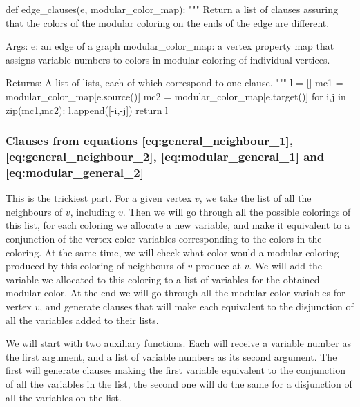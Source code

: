 \documentclass[letterpaper]{article}
\begin{document}
\begin{pyblock}
def edge_clauses(e, modular_color_map):
   """
   Return a list of clauses assuring that the colors of the 
   modular coloring on the ends of the edge are different.

   Args:
      e: an edge of a graph
      modular_color_map: a vertex property map that assigns 
      variable numbers to colors in modular coloring of 
      individual vertices.

   Returns:
      A list of lists, each of which correspond to one clause.
   """
   l = []
   mc1 = modular_color_map[e.source()]
   mc2 = modular_color_map[e.target()]
   for i,j in zip(mc1,mc2):
      l.append([-i,-j])
   return l
\end{pyblock}

\subsubsection{Clauses from equations \eqref{eq:general_neighbour_1},
\eqref{eq:general_neighbour_2}, \eqref{eq:modular_general_1} and
\eqref{eq:modular_general_2}}

This is the trickiest part.  For a given vertex $v$, we take the list of all
the neighbours of $v$, including $v$.  Then we will go through all the possible colorings of
this list, for each coloring we allocate a new variable, and make it equivalent
to a conjunction of the vertex color variables corresponding to the colors in
the coloring.  At the same time, we will check what color would a modular
coloring produced by this coloring of neighbours of $v$ produce at $v$.   We
will add the variable we allocated to this coloring to a list of variables for
the obtained modular color. At the end we will go through all the modular color
variables for vertex $v$, and generate clauses that will make each equivalent
to the disjunction of all the variables added to their lists.

We will start with two auxiliary functions.  Each will receive a variable
number as the first argument, and a list of variable numbers as its second
argument.  The first will generate clauses making the first variable equivalent
to the conjunction of all the variables in the list, the second one will do the
same for a disjunction of all the variables on the list. 
\end{document}
